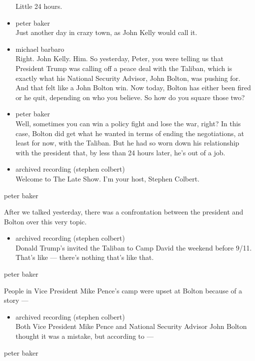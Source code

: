 \begin{itemize}
  Little 24 hours.
\item
  peter baker\\
  Just another day in crazy town, as John Kelly would call it.
\item
  michael barbaro\\
  Right. John Kelly. Him. So yesterday, Peter, you were telling us that
  President Trump was calling off a peace deal with the Taliban, which
  is exactly what his National Security Advisor, John Bolton, was
  pushing for. And that felt like a John Bolton win. Now today, Bolton
  has either been fired or he quit, depending on who you believe. So how
  do you square those two?
\item
  peter baker\\
  Well, sometimes you can win a policy fight and lose the war, right? In
  this case, Bolton did get what he wanted in terms of ending the
  negotiations, at least for now, with the Taliban. But he had so worn
  down his relationship with the president that, by less than 24 hours
  later, he's out of a job.
\item
  archived recording (stephen colbert)\\
  Welcome to The Late Show. I'm your host, Stephen Colbert.
\end{itemize}

peter baker

After we talked yesterday, there was a confrontation between the
president and Bolton over this very topic.

\begin{itemize}
\tightlist
\item
  archived recording (stephen colbert)\\
  Donald Trump's invited the Taliban to Camp David the weekend before
  9/11. That's like --- there's nothing that's like that.
\end{itemize}

peter baker

People in Vice President Mike Pence's camp were upset at Bolton because
of a story ---

\begin{itemize}
\tightlist
\item
  archived recording (stephen colbert)\\
  Both Vice President Mike Pence and National Security Advisor John
  Bolton thought it was a mistake, but according to ---
\end{itemize}

peter baker

